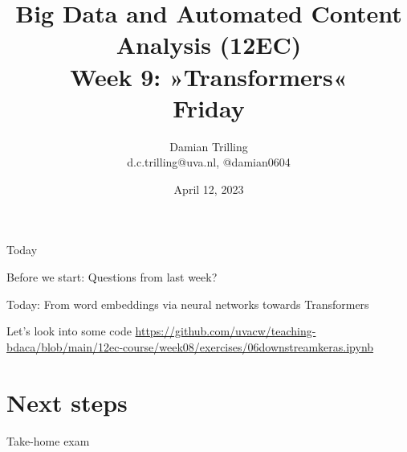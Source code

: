 

\graphicspath{{../../resources/img/}}




\title[Big Data and Automated Content Analysis]{\textbf{Big Data and Automated Content Analysis (12EC)} 
\\Week 9: »Transformers«
\\Friday}
\author[Damian Trilling]{Damian Trilling\\ \footnotesize{d.c.trilling@uva.nl, @damian0604 \\}}
\date{April 12, 2023}


\begin{frame}{}
	\titlepage
\end{frame}

\begin{frame}{Today}
	\tableofcontents
\end{frame}
\begin{frame}[standout]
Before we start: Questions from last week?
\end{frame}


\begin{frame}[standout]
Today: From word embeddings via neural networks towards Transformers
\end{frame}




\begin{frame}{Let's look into some code}
\url{https://github.com/uvacw/teaching-bdaca/blob/main/12ec-course/week08/exercises/06downstreamkeras.ipynb}
\end{frame}




\section{Next steps}
\begin{frame}[standout]
Take-home exam
\end{frame}


\begin{frame}
\printbibliography
\end{frame}




